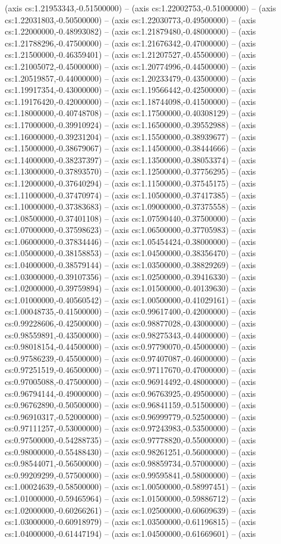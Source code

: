 (axis cs:1.21953343,-0.51500000) -- (axis cs:1.22002753,-0.51000000) -- (axis cs:1.22031803,-0.50500000) -- (axis cs:1.22030773,-0.49500000) -- (axis cs:1.22000000,-0.48993082) -- (axis cs:1.21879480,-0.48000000) -- (axis cs:1.21788296,-0.47500000) -- (axis cs:1.21676342,-0.47000000) -- (axis cs:1.21500000,-0.46359401) -- (axis cs:1.21207527,-0.45500000) -- (axis cs:1.21005072,-0.45000000) -- (axis cs:1.20774996,-0.44500000) -- (axis cs:1.20519857,-0.44000000) -- (axis cs:1.20233479,-0.43500000) -- (axis cs:1.19917354,-0.43000000) -- (axis cs:1.19566442,-0.42500000) -- (axis cs:1.19176420,-0.42000000) -- (axis cs:1.18744098,-0.41500000) -- (axis cs:1.18000000,-0.40748708) -- (axis cs:1.17500000,-0.40308129) -- (axis cs:1.17000000,-0.39910924) -- (axis cs:1.16500000,-0.39552988) -- (axis cs:1.16000000,-0.39231204) -- (axis cs:1.15500000,-0.38939677) -- (axis cs:1.15000000,-0.38679067) -- (axis cs:1.14500000,-0.38444666) -- (axis cs:1.14000000,-0.38237397) -- (axis cs:1.13500000,-0.38053374) -- (axis cs:1.13000000,-0.37893570) -- (axis cs:1.12500000,-0.37756295) -- (axis cs:1.12000000,-0.37640294) -- (axis cs:1.11500000,-0.37545175) -- (axis cs:1.11000000,-0.37470974) -- (axis cs:1.10500000,-0.37417385) -- (axis cs:1.10000000,-0.37383683) -- (axis cs:1.09000000,-0.37375558) -- (axis cs:1.08500000,-0.37401108) -- (axis cs:1.07590440,-0.37500000) -- (axis cs:1.07000000,-0.37598623) -- (axis cs:1.06500000,-0.37705983) -- (axis cs:1.06000000,-0.37834446) -- (axis cs:1.05454424,-0.38000000) -- (axis cs:1.05000000,-0.38158853) -- (axis cs:1.04500000,-0.38356470) -- (axis cs:1.04000000,-0.38579144) -- (axis cs:1.03500000,-0.38829269) -- (axis cs:1.03000000,-0.39107356) -- (axis cs:1.02500000,-0.39416330) -- (axis cs:1.02000000,-0.39759894) -- (axis cs:1.01500000,-0.40139630) -- (axis cs:1.01000000,-0.40560542) -- (axis cs:1.00500000,-0.41029161) -- (axis cs:1.00048735,-0.41500000) -- (axis cs:0.99617400,-0.42000000) -- (axis cs:0.99228606,-0.42500000) -- (axis cs:0.98877028,-0.43000000) -- (axis cs:0.98559891,-0.43500000) -- (axis cs:0.98275343,-0.44000000) -- (axis cs:0.98018154,-0.44500000) -- (axis cs:0.97790070,-0.45000000) -- (axis cs:0.97586239,-0.45500000) -- (axis cs:0.97407087,-0.46000000) -- (axis cs:0.97251519,-0.46500000) -- (axis cs:0.97117670,-0.47000000) -- (axis cs:0.97005088,-0.47500000) -- (axis cs:0.96914492,-0.48000000) -- (axis cs:0.96794144,-0.49000000) -- (axis cs:0.96763925,-0.49500000) -- (axis cs:0.96762890,-0.50500000) -- (axis cs:0.96841159,-0.51500000) -- (axis cs:0.96910317,-0.52000000) -- (axis cs:0.96999779,-0.52500000) -- (axis cs:0.97111257,-0.53000000) -- (axis cs:0.97243983,-0.53500000) -- (axis cs:0.97500000,-0.54288735) -- (axis cs:0.97778820,-0.55000000) -- (axis cs:0.98000000,-0.55488430) -- (axis cs:0.98261251,-0.56000000) -- (axis cs:0.98544071,-0.56500000) -- (axis cs:0.98859734,-0.57000000) -- (axis cs:0.99209299,-0.57500000) -- (axis cs:0.99595841,-0.58000000) -- (axis cs:1.00024639,-0.58500000) -- (axis cs:1.00500000,-0.58997451) -- (axis cs:1.01000000,-0.59465964) -- (axis cs:1.01500000,-0.59886712) -- (axis cs:1.02000000,-0.60266261) -- (axis cs:1.02500000,-0.60609639) -- (axis cs:1.03000000,-0.60918979) -- (axis cs:1.03500000,-0.61196815) -- (axis cs:1.04000000,-0.61447194) -- (axis cs:1.04500000,-0.61669601) -- (axis 